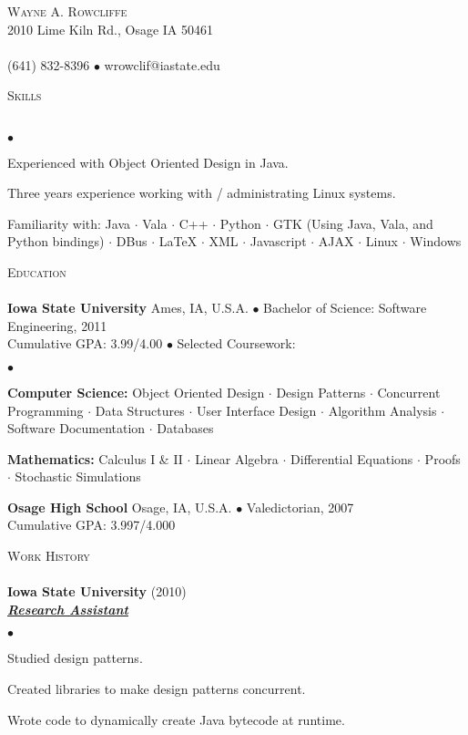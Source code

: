 \documentclass{article}
\newcommand{\lineunder} {
	\vspace*{-8pt} \\ \hspace*{-18pt} \hrulefill \\
}
\newcommand{\header}[1] {
	{\hspace*{-15pt}\vspace*{6pt} \textsc{#1}} \vspace*{-6pt} \lineunder
}
\newcommand{\employer}[3] {
	{ \textbf{#1} (#2)\\ \underline{\textbf{\emph{#3}}}\\  }
}
\newcommand{\contact}[3] {
	\vspace*{-8pt}\begin{center}{\LARGE \scshape {#1}}\\#2 \lineunder#3\end{center}\vspace*{-8pt}
}
\newenvironment{achievements} {
	\begin{list}{$\bullet$}
		{\topsep 0pt \itemsep -2pt}
	}{
		\vspace*{4pt}\end{list}
	}
\newcommand{\schoolwithcourses}[4]{
	\textbf{#1} #2 $\bullet$ #3\\
	#4 $\bullet$  Selected Coursework:\\
	\vspace*{5pt}
}
\newcommand{\school}[4] {
	\textbf{#1} #2 $\bullet$ #3\\
	#4 \\
	\vspace*{5pt}
}
\newcommand{\area}[1] {\textbf{#1:}}
\newcommand{\subject}[1] {#1 $\cdot$}
\newcommand{\lastsubject}[1] {#1}
\begin{document}
\small
\smallskip
\vspace*{-44pt}

\contact{Wayne A. Rowcliffe}
{2010 Lime Kiln Rd., Osage IA 50461}
{(641) 832-8396 $\bullet$ wrowclif@iastate.edu}%

\header{Skills}

	\begin{achievements}
		\item{Experienced with Object Oriented Design in Java.}
		\item{Three years experience working with / administrating Linux systems.}
		\item{Familiarity with:
			\subject{Java}
			\subject{Vala}
			\subject{C++}
			\subject{Python}
			\subject{GTK (Using Java, Vala, and Python bindings)}
			\subject{DBus}
			\subject{\LaTeX{}}
			\subject{XML}
			\subject{Javascript}
			\subject{AJAX}
			\subject{Linux}
			\lastsubject{Windows}
		}

	\end{achievements}

\header{Education}

	\schoolwithcourses{Iowa State University}{Ames, IA, U.S.A.}{Bachelor of Science: Software Engineering, 2011}
	{Cumulative GPA: 3.99/4.00}
		\begin{achievements}
			\item{
				\area{Computer Science}
				\subject{Object Oriented Design}
				\subject{Design Patterns}
				\subject{Concurrent Programming}
				\subject{Data Structures}
				\subject{User Interface Design}
				\subject{Algorithm Analysis}
				\subject{Software Documentation}
				\lastsubject{Databases}
			}
			\item{
				\area{Mathematics}
				\subject{Calculus I \& II}
				\subject{Linear Algebra}
				\subject{Differential Equations}
				\subject{Proofs}
				\lastsubject{Stochastic Simulations}
			}
		\end{achievements}

	\school{Osage High School}{Osage, IA, U.S.A.}{Valedictorian, 2007}
	{Cumulative GPA: 3.997/4.000}

\header{Work History}

	\employer{Iowa State University}{2010}{Research Assistant}
		\begin{achievements}
			\item{Studied design patterns.}
			\item{Created libraries to make design patterns concurrent.}
			\item{Wrote code to dynamically create Java bytecode at runtime.}
		\end{achievements}
\end{document}
